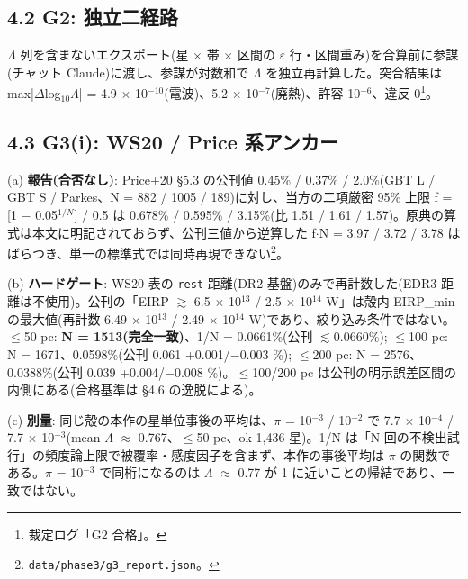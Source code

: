 \documentclass[11pt]{article}
\begin{document}
\subsection*{4.2 G2: 独立二経路}
\noindent \(\Lambda\) 列を含まないエクスポート(星 \(\times\) 帯 \(\times\) 区間の \(\varepsilon\) 行・区間重み)を合算前に参謀(チャット Claude)に渡し、参謀が対数和で \(\Lambda\) を独立再計算した。突合結果は max|\(\Delta\)log\(_{10}\)\(\Lambda\)| = 4.9 \(\times\) 10\(^{-10}\)(電波)、5.2 \(\times\) 10\(^{-7}\)(廃熱)、許容 10\(^{-6}\)、違反 0\footnote{裁定ログ「G2 合格」。}。\par\smallskip


\subsection*{4.3 G3(i): WS20 / Price 系アンカー}
\noindent (a) \textbf{報告(合否なし)}: Price+20 \S{}5.3 の公刊値 0.45\% / 0.37\% / 2.0\%(GBT L / GBT S / Parkes、N = 882 / 1005 / 189)に対し、当方の二項厳密 95\% 上限 f = [1 \(-\) 0.05\(^{1/N}\)] / 0.5 は 0.678\% / 0.595\% / 3.15\%(比 1.51 / 1.61 / 1.57)。原典の算式は本文に明記されておらず、公刊三値から逆算した f\(\cdot\)N = 3.97 / 3.72 / 3.78 はばらつき、単一の標準式では同時再現できない\footnote{\texttt{data/phase3/g3\_report.json}。}。\par\smallskip
\noindent (b) \textbf{ハードゲート}: WS20 表の \texttt{rest} 距離(DR2 基盤)のみで再計数した(EDR3 距離は不使用)。公刊の「EIRP \(\gtrsim\) 6.5 \(\times\) 10\(^{13}\) / 2.5 \(\times\) 10\(^{14}\) W」は殻内 EIRP\_min の最大値(再計数 6.49 \(\times\) 10\(^{13}\) / 2.49 \(\times\) 10\(^{14}\) W)であり、絞り込み条件ではない。\(\leq\)50 pc: \textbf{N = 1513(完全一致)}、1/N = 0.0661\%(公刊 \(\lesssim\)0.0660\%); \(\leq\)100 pc: N = 1671、0.0598\%(公刊 0.061 +0.001/\(-\)0.003 \%); \(\leq\)200 pc: N = 2576、0.0388\%(公刊 0.039 +0.004/\(-\)0.008 \%)。\(\leq\)100/200 pc は公刊の明示誤差区間の内側にある(合格基準は \S{}4.6 の逸脱による)。\par\smallskip
\noindent (c) \textbf{別量}: 同じ殻の本作の星単位事後の平均は、\(\pi\) = 10\(^{-3}\) / 10\(^{-2}\) で 7.7 \(\times\) 10\(^{-4}\) / 7.7 \(\times\) 10\(^{-3}\)(mean \(\Lambda\) \(\approx\) 0.767、\(\leq\)50 pc、ok 1,436 星)。1/N は「N 回の不検出試行」の頻度論上限で被覆率・感度因子を含まず、本作の事後平均は \(\pi\) の関数である。\(\pi\) = 10\(^{-3}\) で同桁になるのは \(\Lambda\) \(\approx\) 0.77 が 1 に近いことの帰結であり、一致ではない。\par\smallskip
\end{document}
